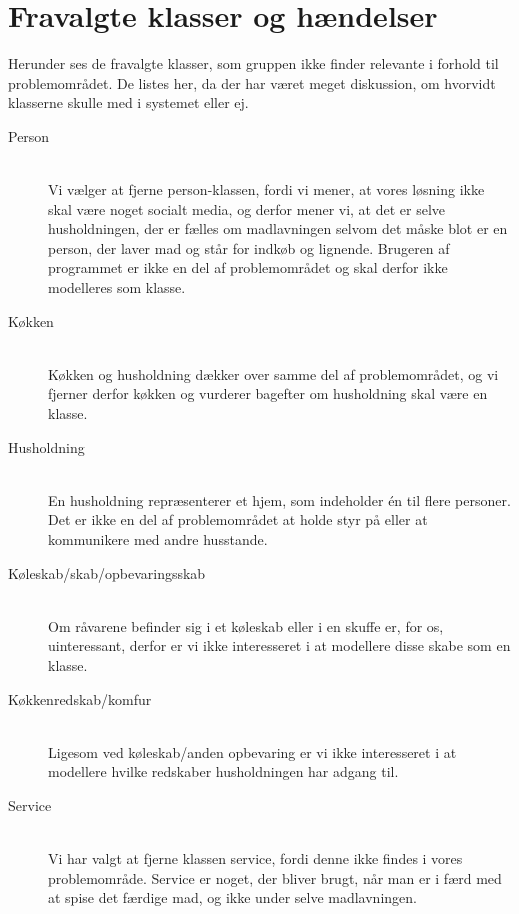 \chapter{Fravalgte klasser og hændelser}
\label{ap:fravalgteklasseroghændelser}

Herunder ses de fravalgte klasser, som gruppen ikke finder relevante i forhold til problemområdet. De listes her, da der har været meget diskussion, om hvorvidt klasserne skulle med i systemet eller ej. 

\begin{description}
\item[Person] \hfill \\
Vi vælger at fjerne person-klassen, fordi vi mener, at vores løsning ikke skal være noget socialt media, og derfor mener vi, at det er selve husholdningen, der er fælles om madlavningen selvom det måske blot er en person, der laver mad og står for indkøb og lignende. Brugeren af programmet er ikke en del af problemområdet og skal derfor ikke modelleres som klasse.

\item[Køkken] \hfill \\
Køkken og husholdning dækker over samme del af problemområdet, og vi fjerner derfor køkken og vurderer bagefter om husholdning skal være en klasse.

\item[Husholdning] \hfill \\
En husholdning repræsenterer et hjem, som indeholder én til flere personer. Det er ikke en del af problemområdet at holde styr på eller at kommunikere med andre husstande.

\item[Køleskab/skab/opbevaringsskab] \hfill \\
Om råvarene befinder sig i et køleskab eller i en skuffe er, for os, uinteressant, derfor er vi ikke interesseret i at modellere disse skabe som en klasse.

\item[Køkkenredskab/komfur] \hfill \\
Ligesom ved køleskab/anden opbevaring er vi ikke interesseret i at modellere hvilke redskaber husholdningen har adgang til.

\item[Service] \hfill \\ 
Vi har valgt at fjerne klassen service, fordi denne ikke findes i vores problemområde. Service er noget, der bliver brugt, når man er i færd med at spise det færdige mad, og ikke under selve madlavningen.


\end{description}

